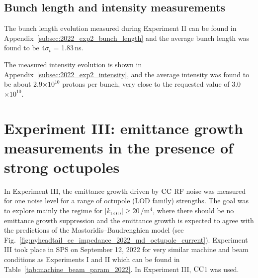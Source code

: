 \subsection{Bunch length and intensity measurements}\label{subsec:bunch_length_intensity_exp2}

The bunch length evolution measured during Experiment II can be found in Appendix~\ref{subsec:2022_exp2_bunch_length} and the average bunch length was found to be $4\sigma_t$ = 1.83\,ns.

The measured intensity evolution is shown in Appendix~\ref{subsec:2022_exp2_intensity}, and the average intensity was found to be about 2.9$\times 10^{10}$ protons per bunch, very close to the requested value of 3.0$\times 10^{10}$.






\section{Experiment III: emittance growth measurements in the presence of strong octupoles}\label{subsec:cc_md_sep_2022_octupole_scan}

In Experiment III, the emittance growth driven by ${\mathrm{CC}}$ RF noise was measured for one noise level for a range of octupole (LOD family) strengths. The goal was to explore mainly the regime for $|k_\mathrm{LOD}| \geq 20$\,$\mathrm{/m^4}$, where there should be no emittance growth suppression and the emittance growth is expected to agree with the predictions of the Mastoridis--Baudrenghien model %
(see Fig.~\ref{fig:pyheadtail_cc_impedance_2022_md_octupole_current}). Experiment III took place in SPS on September 12, 2022 for very similar machine and beam conditions as Experiments I and II which can be found in Table~\ref{tab:machine_beam_param_2022}. In Experiment III, ${\mathrm{CC}}$1 was used.

